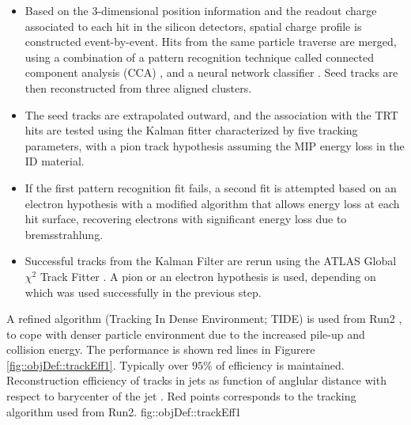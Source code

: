\begin{itemize}
\item Based on the 3-dimensional position information and the readout charge associated to each hit in the silicon detectors, 
spatial charge profile is constructed event-by-event. 
Hits from the same particle traverse are merged, using a combination of a pattern recognition technique called connected component analysis (CCA) \cite{CCApatterRecog}, and a neural network classifier \cite{NNClustering}.
Seed tracks are then reconstructed from three aligned clusters.

\item The seed tracks are extrapolated outward,
and the association with the TRT hits are tested using the Kalman fitter characterized by five tracking parameters,
with a pion track hypothesis assuming the MIP energy loss in the ID material.

\item If the first pattern recognition fit fails, a second fit is attempted based on an electron hypothesis with a modified algorithm that allows energy loss at each hit surface, recovering electrons with significant energy loss due to bremsstrahlung.

\item Successful tracks from the Kalman Filter are rerun using the ATLAS Global $\chi^2$ Track Fitter \cite{157_ATLASGlobTrackFitter}.
A pion or an electron hypothesis is used, depending on which was used successfully in the previous step.

\end{itemize}
A refined algorithm (Tracking In Dense Environment; TIDE) is used from Run2 \cite{130_trackingRun2}, 
to cope with denser particle environment due to the increased pile-up and collision energy.
The performance is shown red lines in Figurere \ref{fig::objDef::trackEff1}. Typically over $95\%$ of efficiency is maintained. \\ 

{Reconstruction efficiency of tracks in jets as function of anglular distance with respect to barycenter of the jet \cite{130_trackingRun2}. Red points corresponds to the tracking algorithm used from Run2.
}
{fig::objDef::trackEff1}



